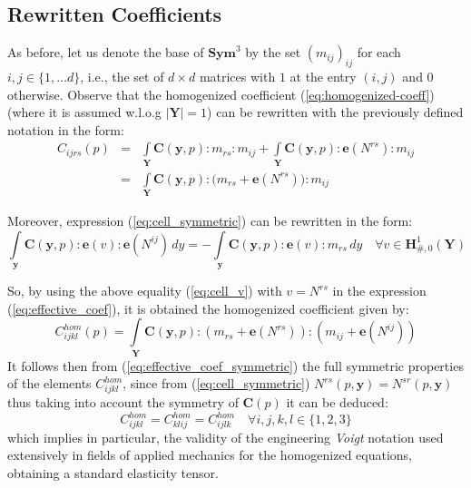 \subsection{Rewritten Coefficients}
As before, let us denote the base of $\mathbf{Sym}^3$ by the set $(m_{ij})_{ij}$ for each $i,j \in \{1,\dots d\}$, i.e., the set of $d \times d$ matrices with $1$ at the entry $(i,j)$ and $0$ otherwise. Observe that the homogenized coefficient (\ref{eq:homogenized-coeff}) (where it is assumed w.l.o.g $\vert \mathbf{Y} \vert = 1$) can be rewritten with the previously defined notation in the form:
\begin{equation}
    \label{eq:effective_coef}
    \begin{array}{ccc}
        C_{ijrs}(p) &=& \int\limits_{\mathbf{Y}} \mathbf{C}(\mathbf{y},p):m_{rs}:m_{ij} + \int\limits_{\mathbf{Y}} \mathbf{C}(\mathbf{y},p):\mathbf{e}(N^{rs}):m_{ij} \\
         &=&\int\limits_{\mathbf{Y}} \mathbf{C}(\mathbf{y},p):\big(m_{rs} + \mathbf{e}(N^{rs})\big):m_{ij}
    \end{array}
\end{equation}

Moreover, expression (\ref{eq:cell_symmetric}) can be rewritten in the form:
\begin{equation}
    \label{eq:cell_v}
    \int\limits_{\mathbf{y}}\mathbf{C}(\mathbf{y},p):\mathbf{e}(v): \mathbf{e}(N^{ij}) \, dy = - \int\limits_{\mathbf{y}} \mathbf{C}(\mathbf{y},p):\mathbf{e}(v):m_{rs}\, dy \quad \forall v \in \mathbf{H}^1_{\#,0}(\mathbf{Y})
\end{equation}

So, by using the above equality (\ref{eq:cell_v}) with $v = N^{rs}$ in the expression (\ref{eq:effective_coef}), it is obtained the homogenized coefficient given by:
\begin{equation}
    \label{eq:effective_coef_symmetric}
    C_{ijkl}^{hom}(p) = \int\limits_{\mathbf{Y}} \mathbf{C}(\mathbf{y},p):(m_{rs}+\mathbf{e}(N^{rs})):(m_{ij}+\mathbf{e}(N^{ij}))
\end{equation}
It follows then from (\ref{eq:effective_coef_symmetric}) the full symmetric properties of the elements $C^{hom}_{ijkl}$, since from (\ref{eq:cell_symmetric}) $N^{rs}(p,\mathbf{y}) = N^{sr}(p, \mathbf{y})$ thus taking into account the symmetry of $\mathbf{C}(p)$ it can be deduced:
\begin{equation*}
    C^{hom}_{ijkl} = C^{hom}_{klij} = C^{hom}_{ijlk} \quad \forall i,j,k,l \in \{1,2,3\}
\end{equation*}
which implies in particular, the validity of the engineering \textit{Voigt} notation used extensively in fields of applied mechanics for the homogenized equations, obtaining a standard elasticity tensor.

